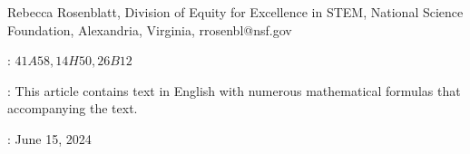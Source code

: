 \documentclass{article}
\theoremstyle{remark}
\numberwithin{equation}{section}
\begin{document}
\noindent Rebecca Rosenblatt, Division of Equity for Excellence in STEM, National Science Foundation, Alexandria,  Virginia, 
rrosenbl@nsf.gov
\bigskip


: $41A58, 14H50, 26B12$
\bigskip

:  This article contains text in English with numerous mathematical formulas that accompanying the text.  

: June 15, 2024
\end{document}
